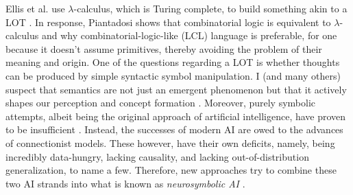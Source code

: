 Ellis et al. use $\lambda$-calculus, which is Turing complete, to build something akin to a LOT \cite{ellis_dreamcoder_2021}. In response, Piantadosi shows that combinatorial logic is equivalent to $\lambda$-calculus and why combinatorial-logic-like (LCL) language is preferable, for one because it doesn't assume primitives, thereby avoiding the problem of their meaning and origin. 
One of the questions regarding a LOT is whether thoughts can be produced by simple syntactic symbol manipulation.
I (and many others) suspect that semantics are not just an emergent phenomenon but that it actively shapes our perception and concept formation \cite{santoro2021symbolic, hofstadter_gdel_1979}.
Moreover, purely symbolic attempts, albeit being the original approach of artificial intelligence, have proven to be insufficient \cite{garcez2020neurosymbolic}. Instead, the successes of modern AI are owed to the advances of connectionist models. These however, have their own deficits, namely, being incredibly data-hungry, lacking causality, and lacking out-of-distribution generalization, to name a few. Therefore, new approaches try to combine these two AI strands into what is known as \emph{neurosymbolic AI} \cite{garcez2020neurosymbolic}.




